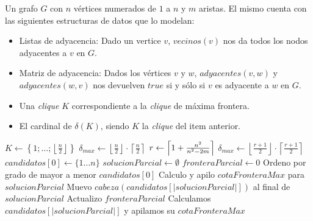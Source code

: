 \begin{pseudocodigo}
    \Require Un grafo $G$ con $n$ v\'ertices numerados de $1$ a $n$ y $m$ aristas. El mismo
        cuenta con las siguientes estructuras de datos que lo modelan:
        \begin{itemize}
            \item Listas de adyacencia: Dado un vertice $v$, $vecinos(v)$ nos da todos los
                nodos adyacentes a $v$ en $G$.

            \item Matriz de adyacencia: Dados los v\'ertices $v$ y $w$, $adyacentes(v,w)$ y
                $adyacentes(w,v)$ nos devuelven $true$ si y s\'olo si $v$ es adyacente
                a $w$ en $G$.
        \end{itemize}

    \Statex
    \Ensure\Statex
        \begin{itemize}
            \item Una \emph{clique} $K$ correspondiente a la \emph{clique} de m\'axima frontera.

            \item El cardinal de $\delta(K)$, siendo $K$ la \emph{clique} del item anterior.
        \end{itemize}

    \Statex
     
        \State $K \gets \left\{1;\dots;\left\lfloor\frac{n}{2}\right\rfloor\right\}$ 
        \State $\delta_{max} \gets \left\lfloor\frac{n}{2}\right\rfloor\cdot
            \left\lceil\frac{n}{2}\right\rceil$ 
        \Statex
    \Else
        \State $r \gets \left\lceil\-1 + \frac{n^2}{n^2-2m}\right\rceil$ 
        \State $\delta_{max} \gets \left\lfloor\frac{r+1}{2}\right\rfloor\cdot
            \left\lceil\frac{r+1}{2}\right\rceil$ 
        \State $candidatos[0] \gets \{1 \dots n\}$ 
        \State $solucionParcial \gets \emptyset$ 
        \State $fronteraParcial \gets 0$ 
        \State Ordeno por grado de mayor a menor $candidatos[0]$ 
        \State Calculo y apilo $cotaFronteraMax$ para $solucionParcial$ 
         
             
                \State Muevo $cabeza(candidatos[|solucionParcial|])$ al final de $solucionParcial$ 
                \State Actualizo $fronteraParcial$ 
                \State Calculamos $candidatos[|solucionParcial|]$ y apilamos su $cotaFronteraMax$ 
            \EndIf {}
        \EndWhile
    \EndIf

    \State {}
\end{pseudocodigo}
